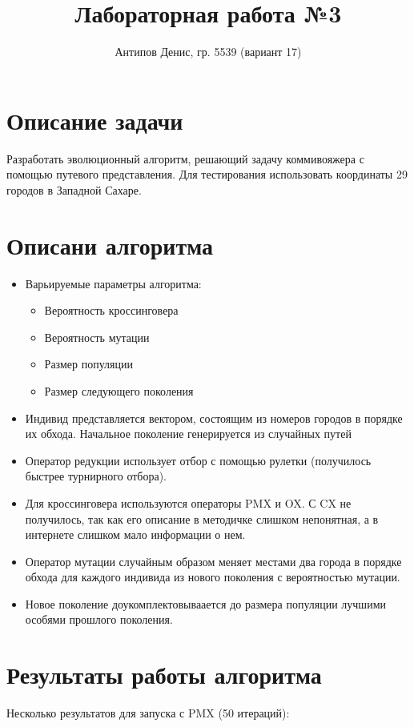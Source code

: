 \documentclass[a4paper]{article}
\title{Лабораторная работа №3}
\author{Антипов Денис, гр. 5539 (вариант 17)}
\begin{document}
\maketitle

\section{Описание задачи}

Разработать эволюционный алгоритм, решающий задачу коммивояжера с помощью путевого представления. Для тестирования использовать координаты 29 городов в Западной Сахаре.

\section{Описани алгоритма}
\begin{itemize}
\item Варьируемые параметры алгоритма:
\begin{itemize}
\item Вероятность кроссинговера
\item Вероятность мутации
\item Размер популяции
\item Размер следующего поколения
\end{itemize}
\item Индивид представляется вектором, состоящим из номеров городов в порядке их обхода. Начальное поколение генерируется из случайных путей
\item Оператор редукции использует отбор с помощью рулетки (получилось быстрее турнирного отбора).
\item Для кроссинговера используются операторы PMX и OX. С CX не получилось, так как его описание в методичке слишком непонятная, а в интернете слишком мало информации о нем.
\item Оператор мутации случайным образом меняет местами два города в порядке обхода для каждого индивида из нового поколения с вероятностью мутации.
\item Новое поколение доукомплектовываается до размера популяции лучшими особями прошлого поколения.
\end{itemize}

\newpage
\section{Результаты работы алгоритма}

Несколько результатов для запуска с PMX (50 итераций): 
\end{document}
